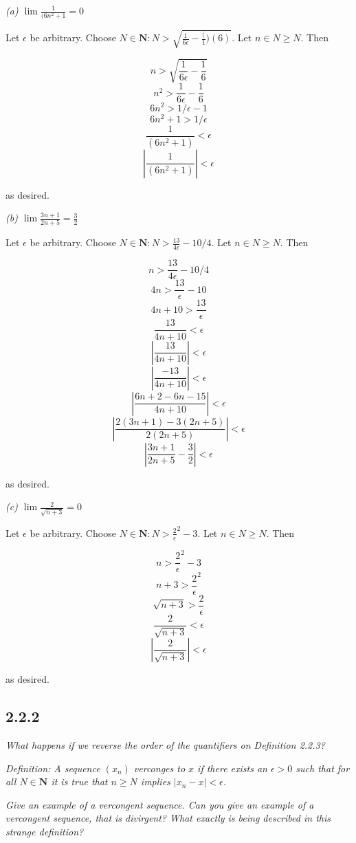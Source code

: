 \documentclass[11pt,oneside,titlepage]{book}
\begin{document}
\textit{(a) $\lim\frac{1}{(6 n ^ 2 + 1} = 0$}

Let $\epsilon$ be arbitrary. Choose
$N \in \textbf{N}: N > \sqrt{\frac{1}{6 \epsilon} - \frac(1)(6)}$. Let $n \in N \geq N$. Then

$$n > \sqrt{\frac{1}{6 \epsilon} - \frac{1}{6}}$$
$$n ^ 2  > \frac{1}{6 \epsilon} - \frac{1}{6}$$
$$6 n ^ 2  > 1/\epsilon - 1$$
$$6 n ^ 2 + 1 > 1/\epsilon$$
$$\frac{1}{(6 n ^ 2 + 1)} < \epsilon$$
$$|\frac{1}{(6 n ^ 2 + 1)}| < \epsilon$$

as desired.

\textit{(b) $\lim\frac{3n + 1}{2n + 5} = \frac{3}{2}$}

Let $\epsilon$ be arbitrary. Choose
$N \in \textbf{N}: N > \frac{13}{4 \epsilon} - 10/4$. Let $n \in N \geq N$. Then

$$ n > \frac{13}{4 \epsilon} - 10/4$$
$$ 4n > \frac{13}{\epsilon} - 10$$
$$ 4n + 10 > \frac{13}{\epsilon} $$
$$ \frac{13}{4n + 10} < \epsilon $$
$$ |\frac{13}{4n + 10}| < \epsilon $$
$$ |\frac{-13}{4n + 10}| < \epsilon $$
$$ |\frac{6n + 2 - 6n - 15}{4n + 10}| < \epsilon $$
$$ |\frac{2(3n + 1) - 3(2n + 5)}{2(2n + 5)}| < \epsilon $$
$$ |\frac{3n + 1}{2n + 5} - \frac{3}{2}| < \epsilon $$

as desired.

\textit{(c) $\lim\frac{2}{\sqrt{n + 3}} = 0$}

Let $\epsilon$ be arbitrary. Choose
$N \in \textbf{N}: N > {\frac{2}{\epsilon}}^2 - 3$. Let $n \in N \geq N$. Then

$$n> {\frac{2}{\epsilon}}^2 - 3$$
$$n + 3 > {\frac{2}{\epsilon}}^2$$
$$\sqrt{n + 3} > \frac{2}{\epsilon}$$
$$\frac{2}{\sqrt{n + 3}} < \epsilon$$
$$|\frac{2}{\sqrt{n + 3}}| < \epsilon$$

as desired.

\subsection*{2.2.2}
\textit{What happens if we reverse the order of the quantifiers on Definition 2.2.3?}

\textit{Definition: A sequence $(x_n)$ verconges to $x$ if there exists an $\epsilon > 0$
  such that for all $N \in \textbf{N}$ it is true that $n \geq N$ implies $|x_n - x| <
  \epsilon$.}

\textit{Give an example of a vercongent sequence. Can you give an example of a vercongent
  sequence, that is divirgent? What exactly is being described in this strange definition?}
\end{document}
